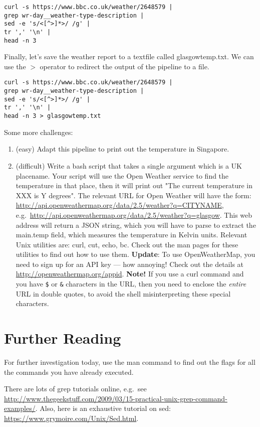 \documentclass{article}
\begin{document}
\begin{lstlisting}[style=BashInputStyle]
curl -s https://www.bbc.co.uk/weather/2648579 | 
grep wr-day__weather-type-description |  
sed -e 's/<[^>]*>/ /g' | 
tr ',' '\n' | 
head -n 3
\end{lstlisting}


Finally, let's save the weather report to a textfile called glasgowtemp.txt. We can use the $>$  operator to redirect the output of the pipeline to a file.

\begin{lstlisting}[style=BashInputStyle]
curl -s https://www.bbc.co.uk/weather/2648579 | 
grep wr-day__weather-type-description |  
sed -e 's/<[^>]*>/ /g' | 
tr ',' '\n' | 
head -n 3 > glasgowtemp.txt
\end{lstlisting}

Some more challenges:
\begin{enumerate}
\item (easy) Adapt this pipeline to print out the temperature in Singapore.
\item (difficult) Write a bash script that takes a single argument which is a UK placename. Your script will use the Open Weather service to find the temperature in that place, then it will print out "The current temperature in XXX is Y degrees".
The relevant URL for Open Weather will have the form:
\url{http://api.openweathermap.org/data/2.5/weather?q=CITYNAME}, e.g.\
\url{http://api.openweathermap.org/data/2.5/weather?q=glasgow}.
This web address will return a JSON string, which you will have to parse to extract the main.temp field, which measures the temperature in Kelvin units.
Relevant Unix utilities are: \textsf{curl}, \textsf{cut}, \textsf{echo}, \textsf{bc}. Check out the man pages for these utilities to find out how to use them. \textbf{Update}: To use OpenWeatherMap, you need to sign up for an API key --- how annoying! Check out the details at \url{http://openweathermap.org/appid}. \textbf{Note!} If you use a curl command and you have \verb+$+ or \verb+&+ characters in the URL, then you need to enclose the \textit{entire} URL in double quotes, to avoid the shell misinterpreting these special characters.
\end{enumerate}

\section*{Further Reading}

For further investigation today, use the man command to find out 
the flags for all the commands you have already executed.

There are lots of grep tutorials online, e.g.\ see \url{http://www.thegeekstuff.com/2009/03/15-practical-unix-grep-command-examples/}.
Also, here is an exhaustive tutorial on sed: \url{https://www.grymoire.com/Unix/Sed.html}.
\end{document}
